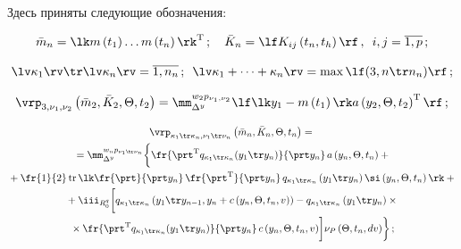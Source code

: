 Здесь приняты следующие обозначения:

    $$

    \bar m_n =\lk m\left(t_1\right) \ldots m\left(t_n\right)\rk^{\mathrm{T}}\,;\quad 

    \bar K_n = \lf K_{ij} \left(t_n, t_h\right)\rf\,, \enskip i,j=\overline{1,p}\,;

    $$

    $$

    \lv \kappa_1\rv \tr \lv \kappa_n\rv =

    \overline{1,n_n}\,;\enskip \lv 

    \kappa_1+\cdots+  \kappa_n\rv = \max \lf (3, n\tr n_n)\rf\,;

    $$

    $$

    \vrp_{3,\nu_1,\nu_2} \left(\bar m_2, \bar K_2, \Theta, t_2\right) =

    \mm_{\Delta^y}^{w_2 p_{\nu_1, \nu_2}} \lf \lk y_1 - 

    m\left(t_1\right)\rk a \left(y_2, \Theta, t_2\right)^{\mathrm{T}}\rf\,;

    $$

    

    \vspace*{-12pt}

    

    \noindent

    \begin{multline}

    \vrp_{\kappa_1\tr \kappa_n, \nu_1\tr \nu_n} \left(

    \bar m_n, \bar K_n, \Theta, t_n\right)= {}\\

    {}=

    \mm_{\Delta^y}^{w_n p_{\nu_1\tr \nu_n}} \biggl\{ 

    \fr{\prt^{\mathrm{T}} q_{\kappa_1\tr \kappa_n} (y_1\tr y_n)}{\prt y_n}\,

     a\left(y_n, \Theta, t_n\right)+{}\\

{}+\fr{1}{2}\,\mathrm{tr}\, \lk \fr{\prt}{\prt y_n}\,

\fr {\prt^{\mathrm{T}}}{\prt y_n}\, q_{\kappa_1 \tr \kappa_n} 

\left(y_1\tr y_n\right) \si \left(y_n,\Theta, t_n\right) \rk +{}\\

{}+\iii_{R_0^q} \biggl[ q_{\kappa_1\tr \kappa_n} 

\left(y_1 \tr y_{n-1}, y_n+ c\left( y_n, \Theta, t_n,v\right)\right)-

q_{\kappa_1\tr \kappa_n} \left(y_1\tr y_n\right) \times{}\\

{}\times

\fr{\prt^{\mathrm{T}} q_{\kappa_1\tr \kappa_n} (y_1\tr y_n)}{\prt y_n}\,

 c\left(y_n,\Theta, t_n, v\right)\biggr] \nu_P \left(\Theta, t_n, dv\right)

 \biggr\}\,;\label{e6.8-s2}

 \end{multline}



